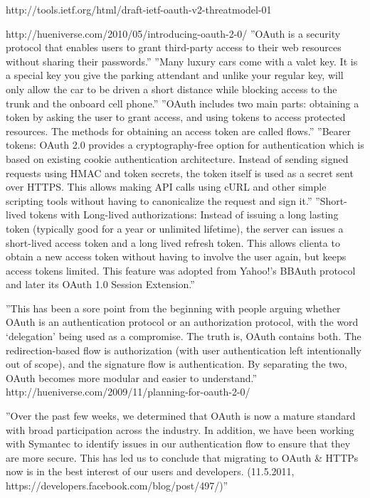 \documentclass[finnish,gradu]{tktltiki}
\begin{document}
  http://tools.ietf.org/html/draft-ietf-oauth-v2-threatmodel-01

  http://hueniverse.com/2010/05/introducing-oauth-2-0/
  ''OAuth is a security protocol that enables users to grant third-party access to their web resources without sharing their passwords.''
  ''Many luxury cars come with a valet key. It is a special key you give the parking attendant and unlike your regular key, will only allow the car to be driven a short distance while blocking access to the trunk and the onboard cell phone.''
  ''OAuth includes two main parts: obtaining a token by asking the user to grant access, and using tokens to access protected resources. The methods for obtaining an access token are called flows.''
  ''Bearer tokens: OAuth 2.0 provides a cryptography-free option for authentication which is based on existing cookie authentication architecture. Instead of sending signed requests using HMAC and token secrets, the token itself is used as a secret sent over HTTPS. This allows making API calls using cURL and other simple scripting tools without having to canonicalize the request and sign it.''
  ''Short-lived tokens with Long-lived authorizations: Instead of issuing a long lasting token (typically good for a year or unlimited lifetime), the server can issues a short-lived access token and a long lived refresh token. This allows clienta to obtain a new access token without having to involve the user again, but keeps access tokens limited. This feature was adopted from Yahoo!’s BBAuth protocol and later its OAuth 1.0 Session Extension.''


  ''This has been a sore point from the beginning with people arguing whether OAuth is an authentication protocol or an authorization protocol, with the word ‘delegation’ being used as a compromise. The truth is, OAuth contains both. The redirection-based flow is authorization (with user authentication left intentionally out of scope), and the signature flow is authentication. By separating the two, OAuth becomes more modular and easier to understand.'' http://hueniverse.com/2009/11/planning-for-oauth-2-0/

  ''Over the past few weeks, we determined that OAuth is now a mature standard with broad participation across the industry. In addition, we have been working with Symantec to identify issues in our authentication flow to ensure that they are more secure. This has led us to conclude that migrating to OAuth \& HTTPs now is in the best interest of our users and developers. (11.5.2011, https://developers.facebook.com/blog/post/497/)''
\end{document}
